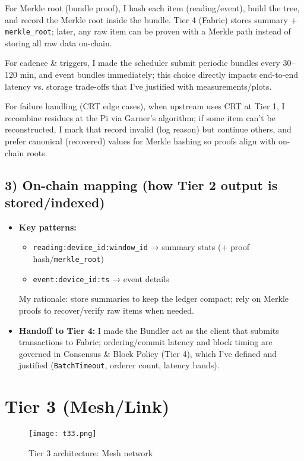 \documentclass[12pt]{article}
\begin{document}
For Merkle root (bundle proof), I hash each item (reading/event), build the tree, and record the Merkle root inside the bundle. Tier 4 (Fabric) stores summary + \texttt{merkle\_root}; later, any raw item can be proven with a Merkle path instead of storing all raw data on-chain.

For cadence \& triggers, I made the scheduler submit periodic bundles every 30–120 min, and event bundles immediately; this choice directly impacts end-to-end latency vs. storage trade-offs that I've justified with measurements/plots.

For failure handling (CRT edge cases), when upstream uses CRT at Tier 1, I recombine residues at the Pi via Garner's algorithm; if some item can't be reconstructed, I mark that record invalid (log reason) but continue others, and prefer canonical (recovered) values for Merkle hashing so proofs align with on-chain roots.

\subsection{3) On-chain mapping (how Tier 2 output is stored/indexed)}

\begin{itemize}
\item \textbf{Key patterns:}
  \begin{itemize}
  \item \texttt{reading:device\_id:window\_id} → summary stats (+ proof hash/\texttt{merkle\_root})
  \item \texttt{event:device\_id:ts} → event details  
  \end{itemize}
  My rationale: store summaries to keep the ledger compact; rely on Merkle proofs to recover/verify raw items when needed.
\item \textbf{Handoff to Tier 4:} I made the Bundler act as the client that submits transactions to Fabric; ordering/commit latency and block timing are governed in Consensus \& Block Policy (Tier 4), which I've defined and justified (\texttt{BatchTimeout}, orderer count, latency bands).
\end{itemize}

\section{Tier 3 (Mesh/Link)}

\begin{figure}[H]
\centering
\texttt{[image: t33.png]}
\caption{Tier 3 architecture: Mesh network}
\end{figure}
\vspace{-0.5cm} %
\end{document}
